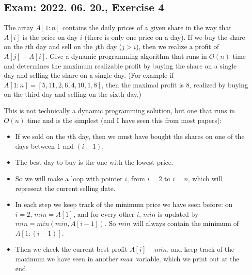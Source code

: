 \subsection{Exam: 2022. 06. 20., Exercise 4}


The array $A[1:n]$ contains the daily prices of a given share in the way that $A[i]$ is the price on day $i$ (there is only one price on a day). If we buy the share on the $i$th day and sell on the $j$th day ($j>i$), then we realize a profit of $A[j]-A[i]$. Give a dynamic programming algorithm that runs in $O(n)$ time and determines the maximum realizable profit by buying the share on a single day and selling the share on a single day. (For example if $A[1:n] = [5,11,2,6,4,10,1,8]$, then the maximal profit is $8$, realized by buying on the third day and selling on the sixth day.)


This is not technically a dynamic programming solution, but one that runs in $O(n)$ time and is the simplest (and I have seen this from most papers):

\begin{itemize}
    \item If we sold on the $i$th day, then we must have bought the shares on one of the days between $1$ and $(i-1)$.
    \item The best day to buy is the one with the lowest price.
    \item So we will make a loop with pointer $i$, from $i=2$ to $i=n$, which will represent the current selling date.
    \item In each step we keep track of the minimum price we have seen before: on $i=2$, $min=A[1]$, and for every other $i$, $min$ is updated by $min=min(min, A[i-1])$. So $min$ will always contain the minimum of $A[1:(i-1)]$.
    \item Then we check the current best profit $A[i]-min$, and keep track of the maximum we have seen in another $max$ variable, which we print out at the end.
\end{itemize}